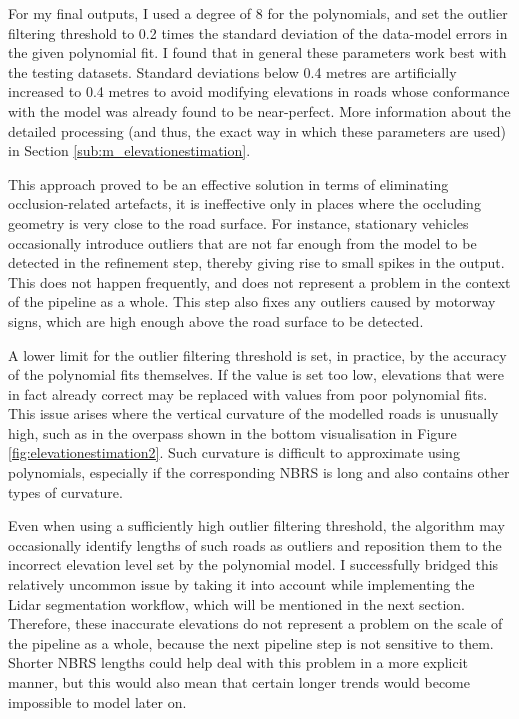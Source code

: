 For my final outputs, I used a degree of 8 for the polynomials, and set the outlier filtering threshold to 0.2 times the standard deviation of the data-model errors in the given polynomial fit. I found that in general these parameters work best with the testing datasets. Standard deviations below 0.4 metres are artificially increased to 0.4 metres to avoid modifying elevations in roads whose conformance with the model was already found to be near-perfect. More information about the detailed processing (and thus, the exact way in which these parameters are used) in Section \ref{sub:m_elevationestimation}.

This approach proved to be an effective solution in terms of eliminating occlusion-related artefacts, it is ineffective only in places where the occluding geometry is very close to the road surface. For instance, stationary vehicles occasionally introduce outliers that are not far enough from the model to be detected in the refinement step, thereby giving rise to small spikes in the output. This does not happen frequently, and does not represent a problem in the context of the pipeline as a whole. This step also fixes any outliers caused by motorway signs, which are high enough above the road surface to be detected.

A lower limit for the outlier filtering threshold is set, in practice, by the accuracy of the polynomial fits themselves. If the value is set too low, elevations that were in fact already correct may be replaced with values from poor polynomial fits. This issue arises where the vertical curvature of the modelled roads is unusually high, such as in the overpass shown in the bottom visualisation in Figure \ref{fig:elevationestimation2}. Such curvature is difficult to approximate using polynomials, especially if the corresponding NBRS is long and also contains other types of curvature.

Even when using a sufficiently high outlier filtering threshold, the algorithm may occasionally identify lengths of such roads as outliers and reposition them to the incorrect elevation level set by the polynomial model. I successfully bridged this relatively uncommon issue by taking it into account while implementing the Lidar segmentation workflow, which will be mentioned in the next section. Therefore, these inaccurate elevations do not represent a problem on the scale of the pipeline as a whole, because the next pipeline step is not sensitive to them. Shorter NBRS lengths could help deal with this problem in a more explicit manner, but this would also mean that certain longer trends would become impossible to model later on.


